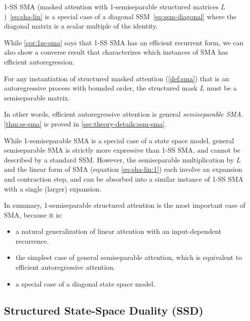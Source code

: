 \begin{corollary}
  \label{cor:1ss-sma}
  1-SS SMA (masked attention with 1-semiseparable structured matrices $L$)~\eqref{eq:sha-lin} is a special case of a diagonal SSM~\eqref{eq:ssm-diagonal} where the diagonal matrix is a scalar multiple of the identity.
\end{corollary}

While \cref{cor:1ss-sma} says that 1-SS SMA has an efficient recurrent form,
we can also show a converse result that characterizes which instances of SMA has efficient autoregression.
\begin{theorem}
  \label{thm:ss-sma}
  For any instantiation of structured masked attention (\cref{def:sma}) that is an autoregressive process with bounded order,
  the structured mask $L$ must be a semiseparable matrix.
\end{theorem}
In other words, efficient autoregressive attention is general \emph{semiseparable SMA}.
\cref{thm:ss-sma} is proved in \cref{sec:theory-details:ssm-sma}.

\begin{remark}
  While 1-semiseparable SMA is a special case of a state space model,
  general semiseparable SMA is strictly more expressive than 1-SS SMA, and cannot be described by a standard SSM.
  However, the semiseparable multiplication by $L$ and the linear form of SMA (equation \eqref{eq:sha-lin:1}) each involve an expansion and contraction step, and can be absorbed into a similar instance of 1-SS SMA with a single (larger) expansion.
\end{remark}


In summary, 1-semiseparable structured attention is the most important case of SMA, because it is:
\begin{itemize}
  \item a natural generalization of linear attention with an input-dependent recurrence.
  \item the simplest case of general semiseparable attention, which is equivalent to efficient autoregressive attention.
  \item a special case of a diagonal state space model.
\end{itemize}

\subsection{Structured State-Space Duality (SSD)}
\label{sec:ssd:ssd}

